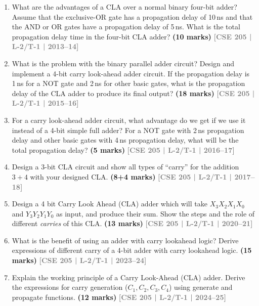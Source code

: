 \documentclass[12pt,a4paper]{article}
\newcommand{\yr}[1]{\hfill\textcolor{gray}{\small\textbf{[#1]}}}
\newcommand{\mk}[1]{\textcolor{orange!70!black}{\small\textbf{(#1 marks)}}}
\begin{document}
\begin{enumerate}

\item What are the advantages of a CLA over a normal binary four-bit adder? Assume that the exclusive-OR gate has a propagation delay of 10\,ns and that the AND or OR gates have a propagation delay of 5\,ns. What is the total propagation delay time in the four-bit CLA adder?
\mk{10} \yr{CSE 205 | L-2/T-1 | 2013--14}


\item What is the problem with the binary parallel adder circuit? Design and implement a 4-bit carry look-ahead adder circuit. If the propagation delay is 1\,ns for a NOT gate and 2\,ns for other basic gates, what is the propagation delay of the CLA adder to produce its final output?
\mk{18} \yr{CSE 205 | L-2/T-1 | 2015--16}


\item For a carry look-ahead adder circuit, what advantage do we get if we use it instead of a 4-bit simple full adder? For a NOT gate with 2\,ns propagation delay and other basic gates with 4\,ns propagation delay, what will be the total propagation delay?
\mk{5} \yr{CSE 205 | L-2/T-1 | 2016--17}

\item Design a 3-bit CLA circuit and show all types of ``carry'' for the addition $3+4$ with your designed CLA.
\mk{8+4} \yr{CSE 205 | L-2/T-1 | 2017--18}

\item Design a 4 bit Carry Look Ahead (CLA) adder which will take $X_3X_2X_1X_0$ and $Y_3Y_2Y_1Y_0$ as input, and produce their sum. Show the steps and the role of different \textit{carries} of this CLA.
\mk{13} \yr{CSE 205 | L-2/T-1 | 2020--21}

\item What is the benefit of using an adder with carry lookahead logic? Derive expressions of different carry of a 4-bit adder with carry lookahead logic.
\mk{15} \yr{CSE 205 | L-2/T-1 | 2023--24}

\item Explain the working principle of a Carry Look-Ahead (CLA) adder. Derive the expressions for carry generation ($C_1, C_2, C_3, C_4$) using generate and propagate functions.
\mk{12} \yr{CSE 205 | L-2/T-1 | 2024--25}

\end{enumerate}
\end{document}
